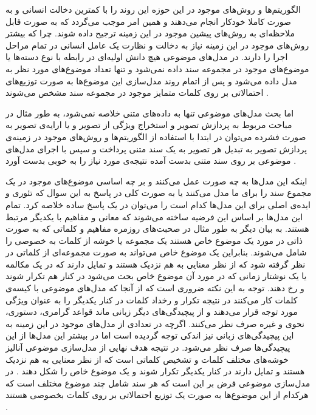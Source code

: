 الگوریتم‌ها و روش‌های موجود در این حوزه این روند را با کمترین دخالت انسانی‌ و به صورت کاملا خودکار انجام می‌‌دهند و همین امر موجب می‌‌گردد که به صورت قابل ملاحظه‌ای به روش‌های پیشین موجود در این زمینه ترجیح داده شوند. چرا که بیشتر روش‌های موجود در این زمینه نیاز به دخالت و نظارت یک عامل انسانی‌ در تمام مراحل اجرا را دارند. در مدل‌های موضوعی هیچ دانش اولیه‌ای در رابطه با نوع دسته‌ها یا موضوع‌های موجود در مجموعه سند داده نمی‌‌شود و تنها تعداد موضوع‌های مورد نظر به مدل داده می‌‌شود و پس از اتمام روند مدل‌سازی این موضوع‌ها به صورت توزیع‌های احتمالاتی بر روی کلمات متمایز موجود در مجموعه سند مشخص می‌‌شوند
\cite{mohr2013introduction}.

اما بحث مدل‌های موضوعی تنها به داده‌های متنی خلاصه نمی‌شود، به طور مثال در مباحث مربوط به پردازش تصویر
و استخراج ویژگی
از تصویر و یا ارایه‌ی تصویر به صورت فشرده می‌‌توان در ابتدا با استفاده از الگوریتم‌ها و روش‌های موجود در زمینه‌ی پردازش تصویر به تبدیل هر تصویر به یک سند متنی پرداخت و سپس با اجرای مدل‌های موضوعی بر روی سند متنی بدست آمده نتیجه‌ی مورد نیاز را به خوبی‌  بدست آورد
\cite{mohr2013introduction}.

اینکه این مدل‌ها به چه صورت عمل می‌‌کنند و بر چه اساسی‌ موضوع‌های موجود در یک مجموع سند را برای ما مدل می‌‌کنند یا به صورت کلی‌ در پاسخ به این سوال که تئوری و ایده‌ی اصلی‌ برای این مدل‌ها کدام است را می‌‌توان در یک پاسخ ساده خلاصه کرد. تمام این مدل‌ها بر اساس این فرضیه ساخته می‌‌شوند که معانی و مفاهیم با یکدیگر مرتبط هستند. به بیان دیگر به طور مثال در صحبت‌های روزمره مفاهیم و کلماتی که به صورت ذاتی در مورد یک موضوع خاص هستند یک مجموعه یا خوشه از کلمات به خصوصی را شامل  می‌شوند. بنابراین یک موضوع خاص می‌‌تواند به صورت مجموعه‌ای از کلماتی‌ در نظر گرفته شود که از نظر معنایی به هم نزدیک هستند و تمایل دارند که در یک مکالمه یا یک نوشتار زمانی‌ که در مورد آن موضوع خاص بحث می‌‌شود در کنار هم تکرار شوند و رخ دهند. توجه به این نکته ضروری است که از آنجا که مدل‌های موضوعی با کیسه‌ی کلمات کار می‌‌کنند در نتیجه تکرار و رخداد کلمات در کنار یکدیگر را به عنوان ویژگی‌ مورد توجه قرار می‌‌دهند و از پیچیدگی‌های دیگر زبانی ماند قواعد گرامری، دستوری، نحوی و غیره صرف نظر می‌‌کنند. اگرچه در تعدادی از مدل‌های موجود در این زمینه به این پیچیدگی‌های زبانی نیز اندکی توجه گردیده است اما در بیشتر این مدل‌ها از این پیچیدگی‌‌ها صرف نظر می‌‌شود. در نتیجه هدف نهایی از مدل‌سازی موضوعی آنالیز خوشه‌های مختلف کلمات و تشخیص کلماتی‌ است که از نظر معنایی به هم نزدیک هستند و تمایل دارند در کنار یکدیگر تکرار شوند و یک موضوع خاص را شکل دهند
\cite{mohr2013introduction}.
در مدل‌سازی موضوعی فرض بر این است که هر سند شامل چند موضوع مختلف است که هرکدام از این موضوع‌ها به صورت یک توزیع احتمالاتی بر روی کلمات بخصوصی هستند
\cite{steyvers2007probabilistic}.

